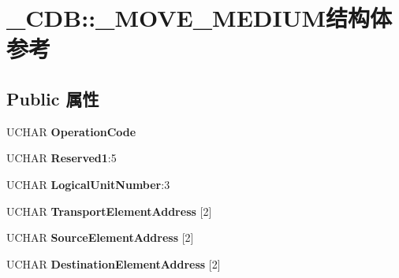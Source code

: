 \hypertarget{struct___c_d_b_1_1___m_o_v_e___m_e_d_i_u_m}{}\section{\+\_\+\+C\+DB\+:\+:\+\_\+\+M\+O\+V\+E\+\_\+\+M\+E\+D\+I\+U\+M结构体 参考}
\label{struct___c_d_b_1_1___m_o_v_e___m_e_d_i_u_m}
\subsection*{Public 属性}
\begin{DoxyCompactItemize}
\item 
\mbox{\label{struct___c_d_b_1_1___m_o_v_e___m_e_d_i_u_m_a1add6d7a29ab8fc5cc252bf71f2fdccf}} 
U\+C\+H\+AR {\bfseries Operation\+Code}
\item 
\mbox{\label{struct___c_d_b_1_1___m_o_v_e___m_e_d_i_u_m_aed48e529d7a7ab37cc034ca652ca1289}} 
U\+C\+H\+AR {\bfseries Reserved1}\+:5
\item 
\mbox{\label{struct___c_d_b_1_1___m_o_v_e___m_e_d_i_u_m_a7c23ba9c583a939620055e2b4793090e}} 
U\+C\+H\+AR {\bfseries Logical\+Unit\+Number}\+:3
\item 
\mbox{\label{struct___c_d_b_1_1___m_o_v_e___m_e_d_i_u_m_ab679fb74a7e3d73a840fff04146cb751}} 
U\+C\+H\+AR {\bfseries Transport\+Element\+Address} \mbox{[}2\mbox{]}
\item 
\mbox{\label{struct___c_d_b_1_1___m_o_v_e___m_e_d_i_u_m_a2449629bc2096f3b571e5db38c81efd7}} 
U\+C\+H\+AR {\bfseries Source\+Element\+Address} \mbox{[}2\mbox{]}
\item 
\mbox{\label{struct___c_d_b_1_1___m_o_v_e___m_e_d_i_u_m_a360e563b19caf1125e1956b78f68f899}} 
U\+C\+H\+AR {\bfseries Destination\+Element\+Address} \mbox{[}2\mbox{]}
\item 
\mbox{\label{struct___c_d_b_1_1___m_o_v_e___m_e_d_i_u_m_afdcf12519be69041ca9c7b8d05658213}} 

\end{DoxyCompactItemize}

